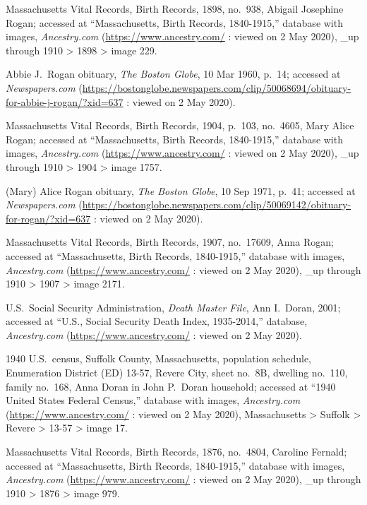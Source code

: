 \begin{thebibliography}{999}
	Massachusetts Vital Records, Birth Records, 1898, no.\ 938, Abigail Josephine Rogan; accessed at ``Massachusetts, Birth Records, 1840-1915,'' database with images, \textit{Ancestry.com} (\url{https://www.ancestry.com/} : viewed on 2 May 2020), \_up through 1910 > 1898 > image 229.
	
	Abbie J.\ Rogan obituary, \textit{The Boston Globe}, 10 Mar 1960, p.\ 14; accessed at \textit{Newspapers.com} (\url{https://bostonglobe.newspapers.com/clip/50068694/obituary-for-abbie-j-rogan/?xid=637} : viewed on 2 May 2020).
	
	Massachusetts Vital Records, Birth Records, 1904, p.\ 103, no.\ 4605, Mary Alice Rogan; accessed at ``Massachusetts, Birth Records, 1840-1915,'' database with images, \textit{Ancestry.com} (\url{https://www.ancestry.com/} : viewed on 2 May 2020), \_up through 1910 > 1904 > image 1757.
	
	(Mary) Alice Rogan obituary, \textit{The Boston Globe}, 10 Sep 1971, p.\ 41; accessed at \textit{Newspapers.com} (\url{https://bostonglobe.newspapers.com/clip/50069142/obituary-for-rogan/?xid=637} : viewed on 2 May 2020).
	
	Massachusetts Vital Records, Birth Records, 1907, no.\ 17609, Anna Rogan; accessed at ``Massachusetts, Birth Records, 1840-1915,'' database with images, \textit{Ancestry.com} (\url{https://www.ancestry.com/} : viewed on 2 May 2020), \_up through 1910 > 1907 > image 2171.
	
	U.S.\ Social Security Administration, \textit{Death Master File}, Ann I.\ Doran, 2001; accessed at ``U.S., Social Security Death Index, 1935-2014,'' database, \textit{Ancestry.com} (\url{https://www.ancestry.com/} : viewed on 2 May 2020).
	
	1940 U.S.\ census, Suffolk County, Massachusetts, population schedule, Enumeration District (ED) 13-57, Revere City, sheet no.\ 8B, dwelling no.\ 110, family no.\ 168, Anna Doran in John P.\ Doran household; accessed at ``1940 United States Federal Census,'' database with images, \textit{Ancestry.com} (\url{https://www.ancestry.com/} : viewed on 2 May 2020), Massachusetts > Suffolk > Revere > 13-57 > image 17.	
	
	Massachusetts Vital Records, Birth Records, 1876, no.\ 4804, Caroline Fernald; accessed at ``Massachusetts, Birth Records, 1840-1915,'' database with images, \textit{Ancestry.com} (\url{https://www.ancestry.com/} : viewed on 2 May 2020), \_up through 1910 > 1876 > image 979.
	

\end{thebibliography}

